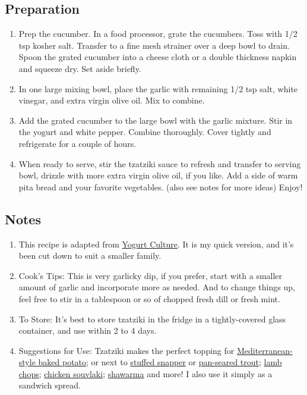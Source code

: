 \subsection{Preparation}
\begin{enumerate}
    \item Prep the cucumber. In a food processor, grate the cucumbers. Toss with 1/2 tsp kosher salt. Transfer to a fine mesh strainer over a deep bowl to drain. Spoon the grated cucumber into a cheese cloth or a double thickness napkin and squeeze dry. Set aside briefly.
    \item In one large mixing bowl, place the garlic with remaining 1/2 tsp salt, white vinegar, and extra virgin olive oil. Mix to combine.
    \item Add the grated cucumber to the large bowl with the garlic mixture. Stir in the yogurt and white pepper. Combine thoroughly. Cover tightly and refrigerate for a couple of hours.
    \item When ready to serve, stir the tzatziki sauce to refresh and transfer to serving bowl, drizzle with more extra virgin olive oil, if you like. Add a side of warm pita bread and your favorite vegetables. (also see notes for more ideas) Enjoy!
\end{enumerate}

\subsection{Notes}
\begin{enumerate}
    \item This recipe is adapted from \href{https://www.amazon.com/Yogurt-Culture-Global-Creamiest-Healthiest/dp/0544252322}{Yogurt Culture}.
        It is my quick version, and it's been cut down to suit a smaller family.
    \item Cook's Tips: This is very garlicky dip, if you prefer, start with a smaller amount of garlic and incorporate more as needed. And to change things up, feel free to stir in a tablespoon or so of chopped fresh dill or fresh mint.
    \item To Store: It's best to store tzatziki in the fridge in a tightly-covered glass container, and use within 2 to 4 days.
    \item Suggestions for Use: Tzatziki makes the perfect topping for \href{https://www.themediterraneandish.com/mediterranean-loaded-baked-potato-recipe/}{Mediterranean-style baked potato}; or next to \href{https://www.themediterraneandish.com/mediterranean-whole-roasted-red-snapper-recipe-with-garlic-and-vegetables/}{stuffed snapper} or \href{https://www.themediterraneandish.com/mediterranean-seared-trout-recipe-tzatziki/}{pan-seared trout}; \href{http://www.themediterraneandish.com/mediterranean-grilled-lamb-chop-recipe-with-tomato-mint-quinoa/}{lamb chops}; \href{https://www.themediterraneandish.com/greek-chicken-souvlaki-recipe-tzatziki/}{chicken souvlaki}; \href{http://www.themediterraneandish.com/chicken-shawarma-sliders/}{shawarma} and more! I also use it simply as a sandwich spread.
\end{enumerate}

